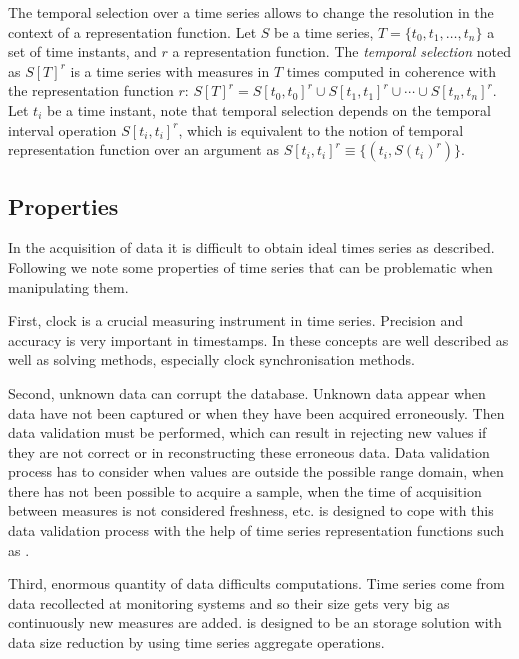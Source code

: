 The temporal selection over a time series allows to change the
resolution in the context of a representation function.  Let $S$ be a
time series, $T=\{t_0,t_1,\dotsc,t_n\}$ a set of time instants, and
$r$ a representation function. The \emph{temporal selection} noted as
$S[T]^r$ is a time series with measures in $T$ times computed in
coherence with the representation function $r$: $S[T]^r = S[t_0,t_0]^r
\cup S[t_1,t_1]^r \cup \dotsb \cup S[t_n,t_n]^r$. Let $t_i$ be a time
instant, note that temporal selection depends on the temporal interval
operation $S[t_i,t_i]^r$, which is equivalent to the notion of
temporal representation function over an argument as $S[t_i,t_i]^r
\equiv \{ (t_i, S(t_i)^r) \}$.





\subsection{Properties}
\label{sec:model:properties} 

In the acquisition of data it is difficult to obtain ideal times
series as described. Following we note some properties of time series
that can be problematic when manipulating them.

First, clock is a crucial measuring instrument in time
series. Precision and accuracy is very important in timestamps.  In
\cite{kopetz11:realtime} these concepts are well described as well as
solving methods, especially clock synchronisation methods.


Second, unknown data can corrupt the database. Unknown data appear
when data have not been captured or when they have been acquired
erroneously. Then data validation must be performed, which can result
in rejecting new values if they are not correct or in reconstructing
these erroneous data.  Data validation process has to consider when
values are outside the possible range domain, when there has not been
possible to acquire a sample, when the time of acquisition between
measures is not considered freshness, etc.  is designed to
cope with this data validation process with the help of time series
representation functions such as \zohe{}.


Third, enormous quantity of data difficults computations.  Time series
come from data recollected at monitoring systems and so their size gets
very big as continuously new measures are added.   is
designed to be an storage solution with data size reduction by using
time series aggregate operations.


